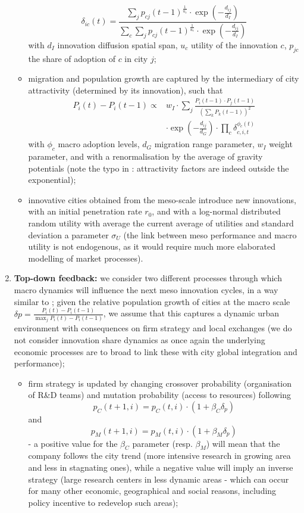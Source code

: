 \documentclass[letterpaper]{article}
\begin{document}
\begin{enumerate}
\begin{itemize}
            \[\delta_{ic}(t) = \frac{\sum_j p_{cj}(t-1)^{\frac{1}{u_c}} \cdot \exp{(-\frac{d_{ij}}{d_I})}}{\sum_c \sum_j p_{cj}(t-1)^{\frac{1}{u_c}} \cdot \exp{(-\frac{d_{ij}}{d_I})}}\] with $d_I$ innovation diffusion spatial span, $u_c$ utility of the innovation $c$, $p_{jc}$ the share of adoption of $c$ in city $j$;
            \item migration and population growth are captured by the intermediary of city attractivity (determined by its innovation), such that
            \begin{equation}
            \begin{split}
            P_i(t) - P_i(t-1) \propto & w_I \cdot \sum_j \frac{P_{i}(t-1) \cdot P_{j}(t-1)}{(\sum_k P_k(t-1))^2}\\
            & \cdot \exp{\left(-\frac{d_{ij}}{d_G}\right) \cdot \prod_c \delta_{c,i,t}^{\phi_{c}(t)}}
            \end{split}
            \end{equation}
            with $\phi_c$ macro adoption levels, $d_G$ migration range parameter, $w_I$ weight parameter, and with a renormalisation by the average of gravity potentials (note the typo in \citep{raimbault2020model}: attractivity factors are indeed outside the exponential);
            \item innovative cities obtained from the meso-scale introduce new innovations, with an initial penetration rate $r_0$, and with a log-normal distributed random utility with average the current average of utilities and standard deviation a parameter $\sigma_U$ (the link between meso performance and macro utility is not endogenous, as it would require much more elaborated modelling of market processes).
        \end{itemize}
\item \textbf{Top-down feedback:} we consider two different processes through which macro dynamics will influence the next meso innovation cycles, in a way similar to \cite{raimbault2021strong}; given the relative population growth of cities at the macro scale $\delta p = \frac{P_i(t)-P_i(t-1)}{\max_j P_i(t)-P_i(t-1)}$, we assume that this captures a dynamic urban environment with consequences on firm strategy and local exchanges (we do not consider innovation share dynamics as once again the underlying economic processes are to broad to link these with city global integration and performance);
    \begin{itemize}
        \item firm strategy is updated by changing crossover probability (organisation of R\&D teams) and mutation probability (access to resources) following \[p_C(t+1,i) = p_C (t,i)\cdot (1+ \beta_C \delta_p)\] and \[p_M(t+1,i) = p_M (t,i)\cdot (1+ \beta_M \delta_p)\] - a positive value for the $\beta_C$ parameter (resp. $\beta_M$) will mean that the company follows the city trend (more intensive research in growing area and less in stagnating ones), while a negative value will imply an inverse strategy (large research centers in less dynamic areas - which can occur for many other economic, geographical and social reasons, including policy incentive to redevelop such areas);

\end{itemize}
\end{enumerate}
\end{document}
